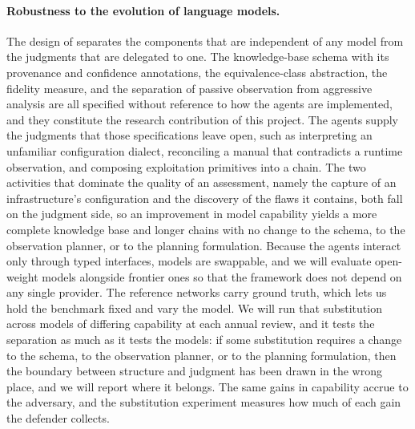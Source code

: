 \paragraph{Robustness to the evolution of language models.}
The design of \sysname separates the components that are independent of any
model from the judgments that are delegated to one. The knowledge-base schema
with its provenance and confidence annotations, the equivalence-class
abstraction, the fidelity measure, and the separation of passive observation
from aggressive analysis are all specified without reference to how the agents
are implemented, and they constitute the research contribution of this
project. The agents supply the judgments that those specifications leave open,
such as interpreting an unfamiliar configuration dialect, reconciling a manual
that contradicts a runtime observation, and composing exploitation primitives
into a chain. The two activities that dominate the quality of an assessment,
namely the capture of an infrastructure's configuration and the discovery of
the flaws it contains, both fall on the judgment side, so an improvement in
model capability yields a more complete knowledge base and longer chains with
no change to the schema, to the observation planner, or to the planning
formulation. Because the agents interact only through typed interfaces, models
are swappable, and we will evaluate open-weight models alongside frontier ones
so that the framework does not depend on any single provider. The reference
networks carry ground truth, which lets us hold the benchmark fixed and vary
the model. We will run that substitution across models of differing capability
at each annual review, and it tests the separation as much as it tests the
models: if some substitution requires a change to the schema, to the
observation planner, or to the planning formulation, then the boundary between
structure and judgment has been drawn in the wrong place, and we will report
where it belongs. The same gains in capability accrue to the adversary, and
the substitution experiment measures how much of each gain the defender
collects.

